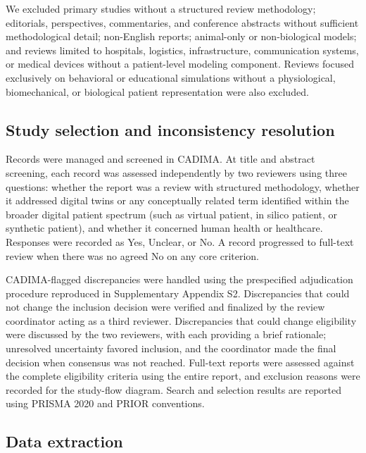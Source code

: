 We excluded primary studies without a structured review methodology; editorials, perspectives, commentaries, and conference abstracts without sufficient methodological detail; non-English reports; animal-only or non-biological models; and reviews limited to hospitals, logistics, infrastructure, communication systems, or medical devices without a patient-level modeling component. Reviews focused exclusively on behavioral or educational simulations without a physiological, biomechanical, or biological patient representation were also excluded.

\subsection{Study selection and inconsistency resolution}

Records were managed and screened in CADIMA. At title and abstract screening, each record was assessed independently by two reviewers using three questions: whether the report was a review with structured methodology, whether it addressed digital twins or any conceptually related term identified within the broader digital patient spectrum (such as virtual patient, in silico patient, or synthetic patient), and whether it concerned human health or healthcare. Responses were recorded as Yes, Unclear, or No. A record progressed to full-text review when there was no agreed No on any core criterion.

CADIMA-flagged discrepancies were handled using the prespecified adjudication procedure reproduced in Supplementary Appendix S2. Discrepancies that could not change the inclusion decision were verified and finalized by the review coordinator acting as a third reviewer. Discrepancies that could change eligibility were discussed by the two reviewers, with each providing a brief rationale; unresolved uncertainty favored inclusion, and the coordinator made the final decision when consensus was not reached. Full-text reports were assessed against the complete eligibility criteria using the entire report, and exclusion reasons were recorded for the study-flow diagram. Search and selection results are reported using PRISMA 2020 and PRIOR conventions.\cite{page2021prisma,gates2022prior}


\subsection{Data extraction}

